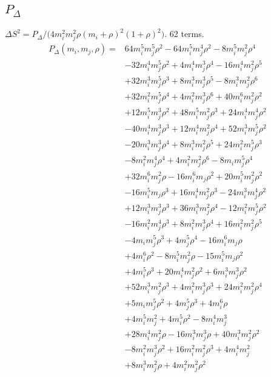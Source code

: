 \subsection*{$P_\Delta$}
$\Delta S^2=P_\Delta/\bigl(4m_i^2m_j^2\rho(m_i+\rho)^2(1+\rho)^2\bigr)$. 62 terms.
{\small
\begin{align*}
P_\Delta(m_i,m_j,\rho)={}&64m_i^{5}m_j^{5}\rho^{2}-64m_i^{5}m_j^{4}\rho^{2}-8m_i^{5}m_j^{2}\rho^{4}\\
&-32m_i^{4}m_j^{5}\rho^{2}+4m_i^{4}m_j^{3}\rho^{4}-16m_i^{4}m_j^{2}\rho^{5}\\
&+32m_i^{3}m_j^{5}\rho^{3}+8m_i^{3}m_j^{3}\rho^{5}-8m_i^{3}m_j^{2}\rho^{6}\\
&+32m_i^{2}m_j^{5}\rho^{4}+4m_i^{2}m_j^{3}\rho^{6}+40m_i^{6}m_j^{2}\rho^{2}\\
&+12m_i^{5}m_j^{3}\rho^{2}+48m_i^{5}m_j^{2}\rho^{3}+24m_i^{4}m_j^{4}\rho^{2}\\
&-40m_i^{4}m_j^{3}\rho^{3}+12m_i^{4}m_j^{2}\rho^{4}+52m_i^{3}m_j^{5}\rho^{2}\\
&-20m_i^{3}m_j^{3}\rho^{4}+8m_i^{3}m_j^{2}\rho^{5}+24m_i^{2}m_j^{5}\rho^{3}\\
&-8m_i^{2}m_j^{4}\rho^{4}+4m_i^{2}m_j^{2}\rho^{6}-8m_im_j^{5}\rho^{4}\\
&+32m_i^{6}m_j^{2}\rho-16m_i^{6}m_j\rho^{2}+20m_i^{5}m_j^{2}\rho^{2}\\
&-16m_i^{5}m_j\rho^{3}+16m_i^{4}m_j^{2}\rho^{3}-24m_i^{3}m_j^{4}\rho^{2}\\
&+12m_i^{3}m_j^{3}\rho^{3}+36m_i^{3}m_j^{2}\rho^{4}-12m_i^{2}m_j^{5}\rho^{2}\\
&-16m_i^{2}m_j^{4}\rho^{3}+8m_i^{2}m_j^{3}\rho^{4}+16m_i^{2}m_j^{2}\rho^{5}\\
&-4m_im_j^{5}\rho^{3}+4m_j^{5}\rho^{4}-16m_i^{6}m_j\rho\\
&+4m_i^{6}\rho^{2}-8m_i^{5}m_j^{2}\rho-15m_i^{5}m_j\rho^{2}\\
&+4m_i^{5}\rho^{3}+20m_i^{4}m_j^{2}\rho^{2}+6m_i^{3}m_j^{3}\rho^{2}\\
&+52m_i^{3}m_j^{2}\rho^{3}+4m_i^{2}m_j^{3}\rho^{3}+24m_i^{2}m_j^{2}\rho^{4}\\
&+5m_im_j^{5}\rho^{2}+4m_j^{5}\rho^{3}+4m_i^{6}\rho\\
&+4m_i^{5}m_j^{2}+4m_i^{5}\rho^{2}-8m_i^{4}m_j^{3}\\
&+28m_i^{4}m_j^{2}\rho-16m_i^{3}m_j^{3}\rho+40m_i^{3}m_j^{2}\rho^{2}\\
&-8m_i^{2}m_j^{3}\rho^{2}+16m_i^{2}m_j^{2}\rho^{3}+4m_i^{4}m_j^{2}\\
&+8m_i^{3}m_j^{2}\rho+4m_i^{2}m_j^{2}\rho^{2}
\end{align*}
}

